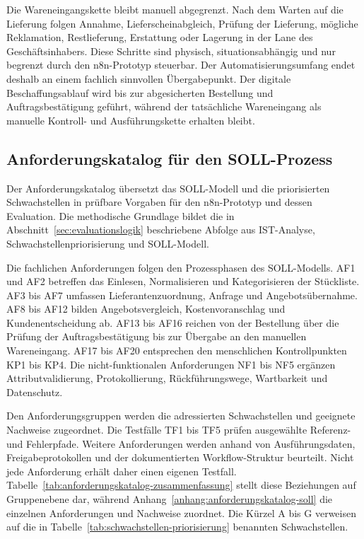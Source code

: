 \documentclass[a4paper,12pt]{article}
\begin{document}
Die Wareneingangskette bleibt manuell abgegrenzt. Nach dem Warten auf die Lieferung folgen Annahme, Lieferscheinabgleich, Prüfung der Lieferung, mögliche Reklamation, Restlieferung, Erstattung oder Lagerung in der Lane des Geschäftsinhabers. Diese Schritte sind physisch, situationsabhängig und nur begrenzt durch den n8n-Prototyp steuerbar. Der Automatisierungsumfang endet deshalb an einem fachlich sinnvollen Übergabepunkt. Der digitale Beschaffungsablauf wird bis zur abgesicherten Bestellung und Auftragsbestätigung geführt, während der tatsächliche Wareneingang als manuelle Kontroll- und Ausführungskette erhalten bleibt.

\subsection{Anforderungskatalog für den SOLL-Prozess}
\label{sec:anforderungskatalog}
Der Anforderungskatalog übersetzt das SOLL-Modell und die priorisierten Schwachstellen in prüfbare Vorgaben für den n8n-Prototyp und dessen Evaluation. Die methodische Grundlage bildet die in Abschnitt~\ref{sec:evaluationslogik} beschriebene Abfolge aus IST-Analyse, Schwachstellenpriorisierung und SOLL-Modell.

Die fachlichen Anforderungen folgen den Prozessphasen des SOLL-Modells. AF1 und AF2 betreffen das Einlesen, Normalisieren und Kategorisieren der Stückliste. AF3 bis AF7 umfassen Lieferantenzuordnung, Anfrage und Angebotsübernahme. AF8 bis AF12 bilden Angebotsvergleich, Kostenvoranschlag und Kundenentscheidung ab. AF13 bis AF16 reichen von der Bestellung über die Prüfung der Auftragsbestätigung bis zur Übergabe an den manuellen Wareneingang. AF17 bis AF20 entsprechen den menschlichen Kontrollpunkten KP1 bis KP4. Die nicht-funktionalen Anforderungen NF1 bis NF5 ergänzen Attributvalidierung, Protokollierung, Rückführungswege, Wartbarkeit und Datenschutz.

Den Anforderungsgruppen werden die adressierten Schwachstellen und geeignete Nachweise zugeordnet. Die Testfälle TF1 bis TF5 prüfen ausgewählte Referenz- und Fehlerpfade. Weitere Anforderungen werden anhand von Ausführungsdaten, Freigabeprotokollen und der dokumentierten Workflow-Struktur beurteilt. Nicht jede Anforderung erhält daher einen eigenen Testfall. Tabelle~\ref{tab:anforderungskatalog-zusammenfassung} stellt diese Beziehungen auf Gruppenebene dar, während Anhang~\ref{anhang:anforderungskatalog-soll} die einzelnen Anforderungen und Nachweise zuordnet. Die Kürzel A bis G verweisen auf die in Tabelle~\ref{tab:schwachstellen-priorisierung} benannten Schwachstellen.
\end{document}
